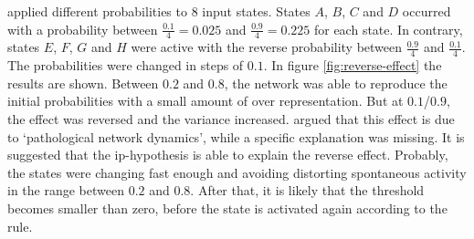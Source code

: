 \textcite{hartmann2015s} applied different probabilities to $8$ input states. States $A$, $B$, $C$ and $D$ occurred with a probability between $\frac{0.1}{4} = 0.025$ and $\frac{0.9}{4} = 0.225$ for each state. In contrary, states $E$, $F$, $G$ and $H$ were active with the reverse probability between $\frac{0.9}{4}$ and $\frac{0.1}{4}$. The probabilities were changed in steps of $0.1$. In figure \ref{fig:reverse-effect} the results are shown. Between $0.2$ and $0.8$, the network was able to reproduce the initial probabilities with a small amount of over representation. But at $0.1$/$0.9$, the effect was reversed and the variance increased. \textcite{hartmann2015s} argued that this effect is due to `pathological network dynamics', while a specific explanation was missing. It is suggested that the \acs{ip}-hypothesis is able to explain the reverse effect. Probably, the states were changing fast enough and avoiding distorting spontaneous activity in the range between $0.2$ and $0.8$. After that, it is likely that the threshold becomes smaller than zero, before the state is activated again according to the rule.

